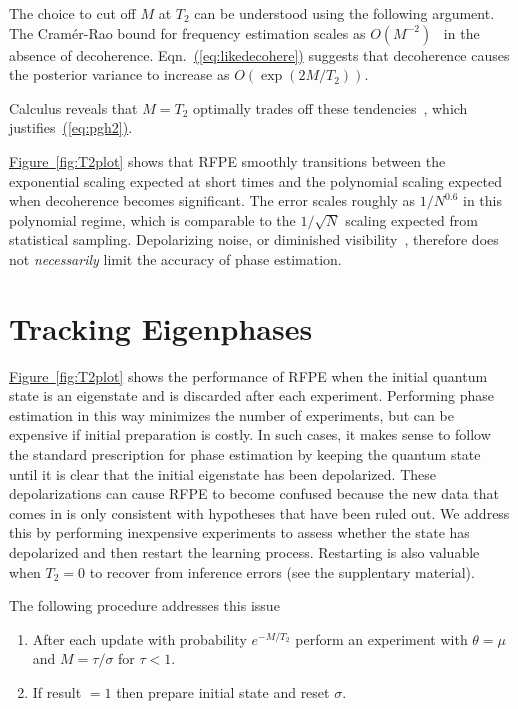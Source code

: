 \documentclass[aps,prl,amsmath,twocolumn,amssymb,superscriptaddress]{revtex4-1}
\newcommand{\eq}[1]{\hyperref[eq:#1]{(\ref*{eq:#1})}}
\newcommand{\app}[1]{the supplentary material}
\newcommand{\fig}[1]{\hyperref[fig:#1]{Figure~\ref*{fig:#1}}}
\begin{document}
The choice to cut off $M$ at $T_2$ can be understood using the following argument.  The Cram\'er-Rao bound for frequency estimation scales as $O(M^{-2})$~\cite{WGC15} in the absence of decoherence.  Eqn.~\eq{likedecohere} suggests that decoherence causes the posterior variance to increase as $O(\exp(2M/T_2))$. { Calculus reveals that $M=T_2$ optimally trades off these tendencies~\cite{ferrie_how_2013}, which justifies~\eq{pgh2}.

\fig{T2plot} shows that RFPE smoothly transitions between the exponential scaling expected at short times and the polynomial scaling expected when decoherence becomes significant.  The error scales roughly as $1/N^{0.6}$ in this polynomial regime, which is comparable to the $1/\sqrt{N}$ scaling expected from statistical sampling.  Depolarizing noise, or diminished visibility~\cite{hayes_swarm_2014}, therefore does not \emph{necessarily} limit the accuracy of phase estimation.



\section{Tracking Eigenphases}

\fig{T2plot} shows the performance of RFPE when the initial quantum state is an eigenstate and is discarded after each experiment.  Performing phase estimation in this way minimizes the number of experiments, but can be expensive if initial preparation is costly.  In such cases, it makes sense to follow the standard prescription for phase estimation by keeping the quantum state until it is clear that the initial eigenstate has been depolarized.  These depolarizations can cause RFPE to become confused because the new data that comes in is only consistent with hypotheses that have been ruled out.  We address this by performing inexpensive experiments to assess whether the state has depolarized and then restart the learning process. Restarting is also valuable when $T_2=0$ to recover from inference errors (see \app{var-reduction}).

The following procedure addresses this issue%
\begin{enumerate}
\item After each update with probability $e^{-M/T_2}$ perform an experiment with $\theta=\mu$ and $M=\tau/\sigma$ for $\tau< 1$.
\item If result $=1$ then prepare initial state and reset $\sigma$.
\end{enumerate}

}
\end{document}
